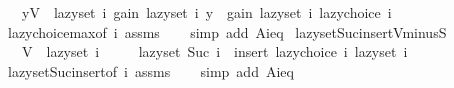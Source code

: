 \begin{isabellebody}
\ \ \ {\isachardoublequoteopen}{\isasymforall}y{\isasymin}V\ {\isacharminus}{\kern0pt}\ lazy{\isacharunderscore}{\kern0pt}set\ i{\isachardot}{\kern0pt}\ gain\ {\isacharparenleft}{\kern0pt}lazy{\isacharunderscore}{\kern0pt}set\ i{\isacharparenright}{\kern0pt}\ y\ {\isasymle}\ gain\ {\isacharparenleft}{\kern0pt}lazy{\isacharunderscore}{\kern0pt}set\ i{\isacharparenright}{\kern0pt}\ {\isacharparenleft}{\kern0pt}lazy{\isacharunderscore}{\kern0pt}choice\ i{\isacharparenright}{\kern0pt}{\isachardoublequoteclose}\isanewline
%
\isadelimproof
\ \ %
\endisadelimproof
%
\isatagproof
{}\isamarkupfalse%
\ lazy{\isacharunderscore}{\kern0pt}choice{\isacharunderscore}{\kern0pt}max{\isacharbrackleft}{\kern0pt}of\ i{\isacharbrackright}{\kern0pt}\ assms\isanewline
\ \ \isamarkupfalse%
\ {\isacharparenleft}{\kern0pt}simp\ add{\isacharcolon}{\kern0pt}\ A{\isacharunderscore}{\kern0pt}i{\isacharunderscore}{\kern0pt}eq{\isacharparenright}{\kern0pt}%
\endisatagproof
{\isafoldproof}%
%
\isadelimproof
\isanewline
%
\endisadelimproof
\isanewline
{}\isamarkupfalse%
\ lazy{\isacharunderscore}{\kern0pt}set{\isacharunderscore}{\kern0pt}Suc{\isacharunderscore}{\kern0pt}insert{\isacharunderscore}{\kern0pt}V{\isacharunderscore}{\kern0pt}minus{\isacharunderscore}{\kern0pt}S{\isacharcolon}{\kern0pt}\isanewline
\ \ \ {\isachardoublequoteopen}V\ {\isacharminus}{\kern0pt}\ lazy{\isacharunderscore}{\kern0pt}set\ i\ {\isasymnoteq}\ {\isacharbraceleft}{\kern0pt}{\isacharbraceright}{\kern0pt}{\isachardoublequoteclose}\isanewline
\ \ \ {\isachardoublequoteopen}lazy{\isacharunderscore}{\kern0pt}set\ {\isacharparenleft}{\kern0pt}Suc\ i{\isacharparenright}{\kern0pt}\ {\isacharequal}{\kern0pt}\ insert\ {\isacharparenleft}{\kern0pt}lazy{\isacharunderscore}{\kern0pt}choice\ i{\isacharparenright}{\kern0pt}\ {\isacharparenleft}{\kern0pt}lazy{\isacharunderscore}{\kern0pt}set\ i{\isacharparenright}{\kern0pt}{\isachardoublequoteclose}\isanewline
%
\isadelimproof
\ \ %
\endisadelimproof
%
\isatagproof
{}\isamarkupfalse%
\ lazy{\isacharunderscore}{\kern0pt}set{\isacharunderscore}{\kern0pt}Suc{\isacharunderscore}{\kern0pt}insert{\isacharbrackleft}{\kern0pt}of\ i{\isacharbrackright}{\kern0pt}\ assms\isanewline
\ \ \isamarkupfalse%
\ {\isacharparenleft}{\kern0pt}simp\ add{\isacharcolon}{\kern0pt}\ A{\isacharunderscore}{\kern0pt}i{\isacharunderscore}{\kern0pt}eq{\isacharparenright}{\kern0pt}%
\endisatagproof
{\isafoldproof}%
%
\isadelimproof
\isanewline
%
\endisadelimproof
\isanewline
{}\isamarkupfalse%
\isanewline
%
\isadelimtheory
%
\endisadelimtheory
%
\isatagtheory
{}\isamarkupfalse%
%
\endisatagtheory
{\isafoldtheory}%
%
\isadelimtheory
%
\endisadelimtheory
%
\end{isabellebody}%
